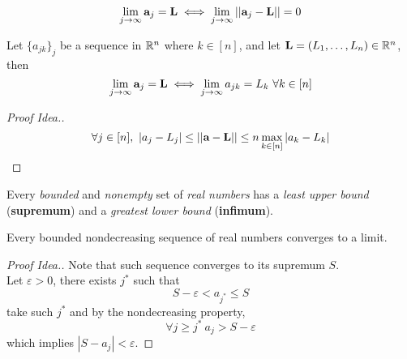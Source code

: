 \documentclass[11pt]{article}
\begin{document}
		    \begin{theorem}
		    		\begin{equation}
		    			\lim_{j \to \infty} \textbf{a} _j = \textbf{L} \iff \lim_{j \to \infty} \vert \vert {\textbf{a}_j - \textbf{L}} \vert \vert = 0
		    		\end{equation}
		    \end{theorem}
		    
		    \begin{theorem}
		    		Let $\{a_{jk}\}_j$ be a sequence in $\mathbb{R}^n$ where $k \in [n]$, and let $\textbf{L} = (L_1, \dots, L_n) \in \mathbb{R}^n$, then
		    		\begin{equation}
		    			\lim_{j \to \infty} \textbf{a} _j = \textbf{L} \iff \lim_{j \to \infty} a_{jk} = L_k\ \forall k \in [n]
		    		\end{equation}
		    		\begin{proof}[Proof Idea.]
		    			\begin{equation}
		    				\forall j \in [n],\ |a_j - L_j| \leq \vert \vert {\textbf{a}- \textbf{L}} \vert \vert \leq n \max_{k \in [n]} |a_k - L_k|
		    			\end{equation}
		    		\end{proof}
		    \end{theorem}
		    
		    \begin{axiom}
		    		Every \emph{bounded} and \emph{nonempty} set of \emph{real numbers} has a \emph{least upper bound} (\textbf{supremum}) and a \emph{greatest lower bound} (\textbf{infimum}).
		    \end{axiom}
		    
		    \begin{theorem}
		    		Every bounded nondecreasing sequence of real numbers converges to a limit.
		    		\begin{proof}[Proof Idea.]
		    			Note that such sequence converges to its supremum $S$.\\
		    			Let $\varepsilon > 0$, there exists $j^*$ such that
		    			\begin{equation}
		    				S - \varepsilon < a_{j^*} \leq S
		    			\end{equation}
		    			take such $j^*$ and by the nondecreasing property,
		    			\begin{equation}
		    				\forall j \geq j^*\ a_j > S - \varepsilon
		    			\end{equation}
		    			which implies $|S - a_j| < \varepsilon$.
		    		\end{proof}
		    \end{theorem}
		    
\end{document}
